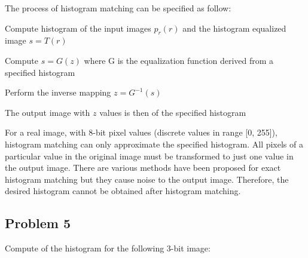 \documentclass[conference]{IEEEtran}
\begin{document}
The process of histogram matching can be specified as follow:
\begin{description}[font=$\bullet$~\normalfont\scshape\color{red!50!black}]
  \item Compute histogram of the input images \(p_r(r)\) and the histogram equalized image \(s = T(r)\)
  \item Compute \(s = G(z)\) where G is the equalization function derived from a specified histogram
  \item Perform the inverse mapping \(z = G^{-1}(s)\)
  \item The output image with \(z\) values is then of the specified histogram
\end{description}

For a real image, with 8-bit pixel values (discrete values in range [0, 255]), histogram matching can only approximate the specified histogram. All pixels of a particular value in the original image must be transformed to just one value in the output image. There are various methods have been proposed for exact histogram matching but they cause noise to the output image. Therefore, the desired histogram cannot be obtained after histogram matching.

\subsection{Problem 5}

Compute of the histogram for the following 3-bit image:
\end{document}
